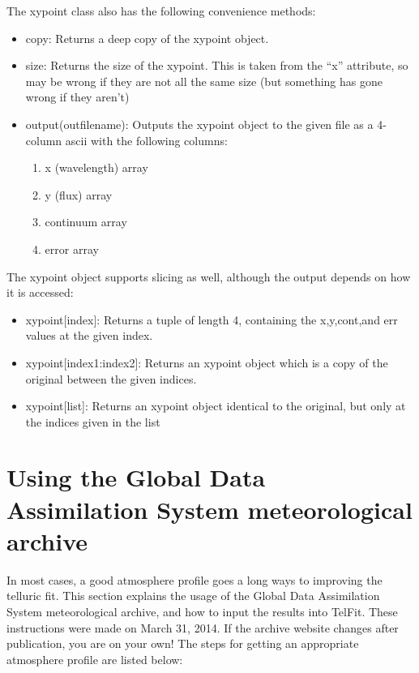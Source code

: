 \documentclass{article}
\begin{document}
\begin{itemize}
The xypoint class also has the following convenience methods:
\begin{itemize}

  \item copy: Returns a deep copy of the xypoint object.
  \item size: Returns the size of the xypoint. This is taken from the ``x'' attribute, so may be wrong if they are not all the same size (but something has gone wrong if they aren't)
  \item output(outfilename): Outputs the xypoint object to the given file as a 4-column ascii with the following columns:
  \begin{enumerate}
    \item x (wavelength) array
    \item y (flux) array
    \item continuum array
    \item error array
  \end{enumerate}
  
  
\end{itemize}
  
The xypoint object supports slicing as well, although the output depends on how it is accessed:
\begin{itemize}

  \item xypoint[index]: Returns a tuple of length 4, containing the x,y,cont,and err values at the given index.
  \item xypoint[index1:index2]: Returns an xypoint object which is a copy of the original between the given indices. 
  \item xypoint[list]: Returns an xypoint object identical to the original, but only at the indices given in the list

\end{itemize}




\end{itemize}



\appendix
\section{Using the Global Data Assimilation System meteorological archive}

\label{ap:gdas}

In most cases, a good atmosphere profile goes a long ways to improving the telluric fit. This section explains the usage of the Global Data Assimilation System meteorological archive, and how to input the results into TelFit. These instructions were made on March 31, 2014. If the archive website changes after publication, you are on your own! The steps for getting an appropriate atmosphere profile are listed below:
\end{document}

